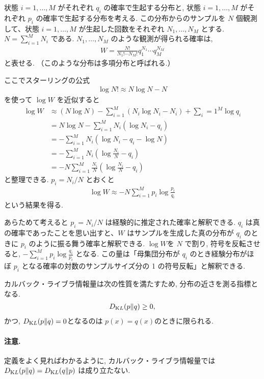 \documentclass{jarticle}
\begin{document}
状態 $i=1,\ldots,M$ がそれぞれ $q_i$ の確率で生起する分布と, 状態 $i=1,\ldots,M$ がそれぞれ $p_i$ の確率で生起する分布を考える. この分布からのサンプルを $N$ 個観測して、状態 $i=1,\ldots,M$ が生起した回数をそれぞれ $N_1,\ldots,N_M$ とする. $ N=\sum_{i=1}^{M}N_i$ である. 
$N_1,\ldots,N_M$ のような観測が得られる確率は,
\begin{align}
W=\frac{N!}{N_1! \cdots N_M!}q^{N_1}_1 \cdots q^{N_M}_M
\end{align}
と表せる. （このような分布は多項分布と呼ばれる.）

ここでスターリングの公式
\begin{align}
\log N! \approx N\log N -N
\end{align}
を使って $\log W$ を近似すると
\begin{align}
\log W &\approx (N \log N) - \sum_{i=1}^{M}( N_i \log N_i -N_i) + \sum_i=1^{M} \log q_i \\
&= N \log N - \sum_{i=1}^M N_i (\log N_i - q_i) \\
&= - \sum_{i=1}^M N_i (\log N_i - q_i -\log N ) \\
&= - \sum_{i=1}^M N_i (\log \frac{N_i}{N} - q_i) \\
&= - N \sum_{i=1}^M \frac{N_i}{N} (\log \frac{N_i}{N} - q_i) 
\end{align}
と整理できる.
$p_i = N_i/N$ とおくと
\begin{align}
\log W \approx -N\sum_{i=1}^{M}p_i \log\frac{p_i}{q_i}
\end{align}
という結果を得る.

あらためて考えると $p_i = N_i/N$  は経験的に推定された確率と解釈できる.
$q_i$ は真の確率であったことを思い出すと、$W$ はサンプルを生成した真の分布が $q_i$ のときに $p_i$ のように振る舞う確率と解釈できる. 
$\log W$を $N$ で割り, 符号を反転させると, $-\sum_{i=1}^{M} p_i \log {\frac {q_i}{p_i}}$ となる.
この量は「母集団分布が $q_i$ のとき経験分布がほぼ $p_i$ となる確率の対数のサンプルサイズ分の 1 の符号反転」と解釈できる.

カルバック・ライブラ情報量は次の性質を満たすため, 分布の近さを測る指標となる. 
\begin{align}
D_{\mathrm KL}(p\|q) \ge 0,
\end{align}
かつ, $D_{\mathrm KL}(p\|q) = 0$となるのは $p(x)=q(x)$のときに限られる.

\paragraph{注意.}
定義をよく見ればわかるように, カルバック・ライブラ情報量では $D_{\mathrm KL}(p\|q) =D_{\mathrm KL}(q\|p)$ は成り立たない. 
\end{document}
